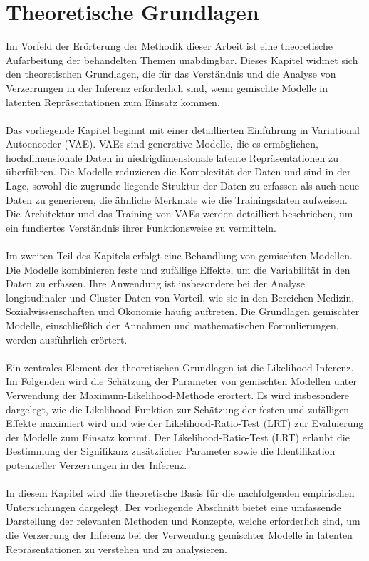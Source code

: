 \documentclass[%
thesis=student,%
coverpage=false,%
titlepage=false,%
headmarks=true, %
german,%
font=libertine, %
math=newpxtx, %
BCOR=5mm,%
coverBCOR=11mm%
]{tumbook}
\theoremstyle{break}
\begin{document}
\chapter{Theoretische Grundlagen}
Im Vorfeld der Erörterung der Methodik dieser Arbeit ist eine theoretische Aufarbeitung der behandelten Themen unabdingbar. Dieses Kapitel widmet sich den theoretischen Grundlagen, die für das Verständnis und die Analyse von Verzerrungen in der Inferenz erforderlich sind, wenn gemischte Modelle in latenten Repräsentationen zum Einsatz kommen.\\
\\
Das vorliegende Kapitel beginnt mit einer detaillierten Einführung in Variational Autoencoder (VAE). VAEs sind generative Modelle, die es ermöglichen, hochdimensionale Daten in niedrigdimensionale latente Repräsentationen zu überführen. Die Modelle reduzieren die Komplexität der Daten und sind in der Lage, sowohl die zugrunde liegende Struktur der Daten zu erfassen als auch neue Daten zu generieren, die ähnliche Merkmale wie die Trainingsdaten aufweisen. Die Architektur und das Training von VAEs werden detailliert beschrieben, um ein fundiertes Verständnis ihrer Funktionsweise zu vermitteln.\\
\\
Im zweiten Teil des Kapitels erfolgt eine Behandlung von gemischten Modellen. Die Modelle kombinieren feste und zufällige Effekte, um die Variabilität in den Daten zu erfassen. Ihre Anwendung ist insbesondere bei der Analyse longitudinaler und Cluster-Daten von Vorteil, wie sie in den Bereichen Medizin, Sozialwissenschaften und Ökonomie häufig auftreten. Die Grundlagen gemischter Modelle, einschließlich der Annahmen und mathematischen Formulierungen, werden ausführlich erörtert.\\
\\
Ein zentrales Element der theoretischen Grundlagen ist die Likelihood-Inferenz. Im Folgenden wird die Schätzung der Parameter von gemischten Modellen unter Verwendung der Maximum-Likelihood-Methode erörtert. Es wird insbesondere dargelegt, wie die Likelihood-Funktion zur Schätzung der festen und zufälligen Effekte maximiert wird und wie der Likelihood-Ratio-Test (LRT) zur Evaluierung der Modelle zum Einsatz kommt. Der Likelihood-Ratio-Test (LRT) erlaubt die Bestimmung der Signifikanz zusätzlicher Parameter sowie die Identifikation potenzieller Verzerrungen in der Inferenz.\\
\\
In diesem Kapitel wird die theoretische Basis für die nachfolgenden empirischen Untersuchungen dargelegt. Der vorliegende Abschnitt bietet eine umfassende Darstellung der relevanten Methoden und Konzepte, welche erforderlich sind, um die Verzerrung der Inferenz bei der Verwendung gemischter Modelle in latenten Repräsentationen zu verstehen und zu analysieren.\\
\end{document}

